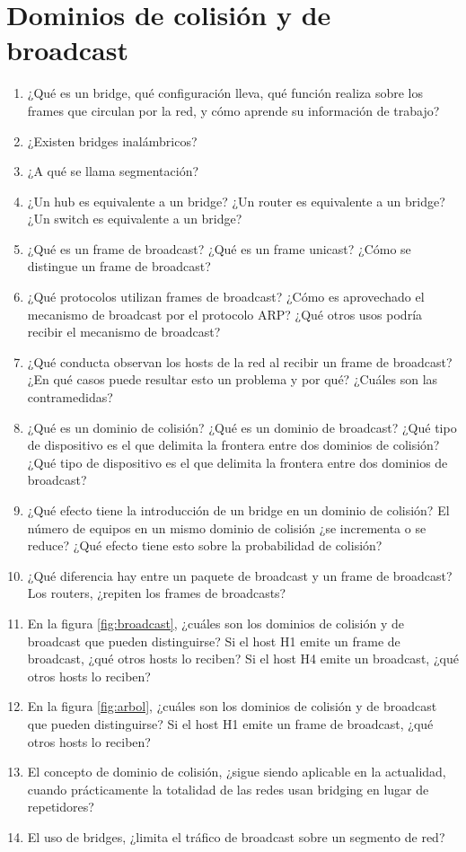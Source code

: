 \section{Dominios de colisión y de broadcast}
\label{sub:}
\begin{enumerate}
\item ¿Qué es un bridge, qué configuración lleva, qué función realiza sobre los frames que circulan por la red, y cómo aprende su información de trabajo? 
\item ¿Existen bridges inalámbricos? 
\item ¿A qué se llama segmentación?
\item ¿Un hub es equivalente a un bridge? ¿Un router es equivalente a un bridge? ¿Un switch es equivalente a un bridge? 
\item ¿Qué es un frame de broadcast? ¿Qué es un frame unicast? ¿Cómo se distingue un frame de broadcast? 
\item ¿Qué protocolos utilizan frames de broadcast? ¿Cómo es aprovechado el mecanismo de broadcast por el protocolo ARP? ¿Qué otros usos podría recibir el mecanismo de broadcast?
\item ¿Qué conducta observan los hosts de la red al recibir un frame de broadcast? ¿En qué casos puede resultar esto un problema y por qué? ¿Cuáles son las contramedidas?
\item ¿Qué es un dominio de colisión?  ¿Qué es un dominio de broadcast? ¿Qué tipo de dispositivo es el que delimita la frontera entre dos dominios de colisión?  ¿Qué tipo de dispositivo es el que delimita la frontera entre dos dominios de broadcast? 
\item ¿Qué efecto tiene la introducción de un bridge en un dominio de colisión? El número de equipos en un mismo dominio de colisión ¿se incrementa o se reduce? ¿Qué efecto tiene esto sobre la probabilidad de colisión?
\item ¿Qué diferencia hay entre un paquete de broadcast y un frame de broadcast? Los routers, ¿repiten los frames de broadcasts?
\item En la figura \ref{fig:broadcast}, ¿cuáles son los dominios de colisión y de broadcast que pueden distinguirse? Si el host H1 emite un frame de broadcast, ¿qué otros hosts lo reciben? Si el host H4 emite un broadcast, ¿qué otros hosts lo reciben?
\item En la figura \ref{fig:arbol}, ¿cuáles son los dominios de colisión y de broadcast que pueden distinguirse? Si el host H1 emite un frame de broadcast, ¿qué otros hosts lo reciben? 
\item El concepto de dominio de colisión, ¿sigue siendo aplicable en la actualidad, cuando prácticamente la totalidad de las redes usan bridging en lugar de repetidores? 
\item El uso de bridges, ¿limita el tráfico de broadcast sobre un segmento de red?
 \end{enumerate}


